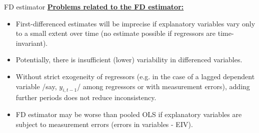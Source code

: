 \documentclass[usenames,dvipsnames]{beamer}
\begin{document}
\begin{frame}{FD estimator}
\underline{\textbf{Problems related to the FD estimator:}}
\begin{itemize}
\item First-differenced estimates will be imprecise if explanatory variables vary only to a small extent over time (no estimate possible if regressors are time-invariant).
\item Potentially, there is insufficient (lower) variability in differenced variables.
\item Without strict exogeneity of regressors (e.g. in the case of a lagged dependent variable /say, $y_{i,t-1}$/ among regressors or with measurement errors), adding further periods does not reduce inconsistency.
\item FD estimator may be worse than pooled OLS if explanatory variables are subject to measurement errors (errors in variables - EIV).
\end{itemize}
\end{frame}
\end{document}
